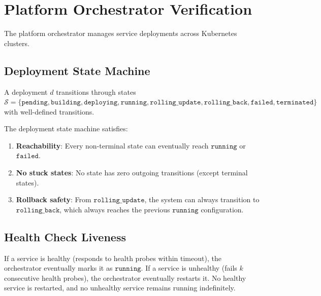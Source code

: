 \section{Platform Orchestrator Verification}

\label{sec:platform}

The platform orchestrator manages service deployments across Kubernetes
clusters.

\subsection{Deployment State Machine}

\begin{definition}
A deployment $d$ transitions through states $\mathcal{S} = \{
\texttt{pending}, \texttt{building}, \texttt{deploying}, \texttt{running},
\texttt{rolling\_update}, \texttt{rolling\_back}, \texttt{failed},
\texttt{terminated}\}$ with well-defined transitions.
\end{definition}

\begin{theorem}
The deployment state machine satisfies:
\begin{enumerate}[leftmargin=1.4em]
    \item \textbf{Reachability}: Every non-terminal state can eventually reach
    $\texttt{running}$ or $\texttt{failed}$.
    \item \textbf{No stuck states}: No state has zero outgoing transitions
    (except terminal states).
    \item \textbf{Rollback safety}: From $\texttt{rolling\_update}$, the system
    can always transition to $\texttt{rolling\_back}$, which always reaches
    the previous $\texttt{running}$ configuration.
\end{enumerate}
\end{theorem}

\subsection{Health Check Liveness}

\begin{theorem}
If a service is healthy (responds to health probes within timeout), the
orchestrator eventually marks it as $\texttt{running}$. If a service is
unhealthy (fails $k$ consecutive health probes), the orchestrator eventually
restarts it. No healthy service is restarted, and no unhealthy service remains
running indefinitely.
\end{theorem}

